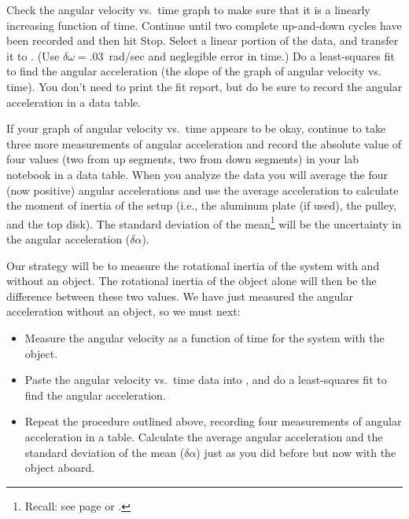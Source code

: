 
Check the angular velocity vs.\ time graph to make
sure that it is a linearly increasing function of time. Continue until two
complete up-and-down cycles have been recorded and then hit Stop. Select a
linear portion of the data, and transfer it to \WAPP.  (Use $\delta \omega = .03$~rad/sec
and neglegible error in time.) Do a
least-squares fit to find the angular acceleration (the slope of the
graph of angular velocity vs. time).  You don't need to print the fit
report, but do be sure to record the angular acceleration in a data
table.

If your graph of angular velocity vs.\ time appears to be okay, continue to take three
more measurements of angular acceleration and record the absolute value of four values 
(two from up segments, two from down segments) in your
lab notebook in a data table.  When you analyze the data you will average the
four (now positive) angular accelerations and use the average acceleration to
calculate the moment of
inertia of the setup (i.e., the aluminum plate (if used), the pulley, and the
top disk).  The standard deviation of the mean\footnote{
Recall: see page \pageref{sdev.mean} or  \pageref{atwood.sdev.mean}.} will be the uncertainty
in the angular acceleration ($\delta\alpha$).

Our strategy will be to measure
the rotational inertia of the system with and without an object.  The
rotational inertia of the object alone will then be the difference
between these two values.  We have just measured the angular acceleration
without an object, so we must next:
%
\begin{itemize}
\item Measure the angular velocity as a function of time for
the system with the object.
%
\item Paste the angular velocity vs.\ time data into \WAPP, and do a
least-squares fit to find the angular acceleration.
%
\item Repeat the procedure outlined above, recording
four measurements of angular acceleration in a table. Calculate the
average angular acceleration and the standard deviation of the mean
($\delta \alpha$) just as you did before but now with the object aboard.
\end{itemize}

